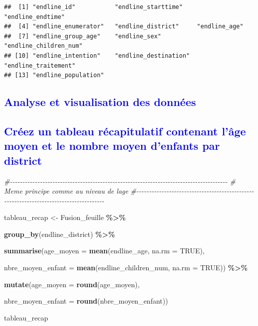 \documentclass[
]{article}
\newenvironment{Shaded}{\begin{snugshade}}{\end{snugshade}}
\newcommand{\AttributeTok}[1]{\textcolor[rgb]{0.13,0.29,0.53}{#1}}
\newcommand{\CommentTok}[1]{\textcolor[rgb]{0.56,0.35,0.01}{\textit{#1}}}
\newcommand{\ConstantTok}[1]{\textcolor[rgb]{0.56,0.35,0.01}{#1}}
\newcommand{\FunctionTok}[1]{\textcolor[rgb]{0.13,0.29,0.53}{\textbf{#1}}}
\newcommand{\NormalTok}[1]{#1}
\newcommand{\OtherTok}[1]{\textcolor[rgb]{0.56,0.35,0.01}{#1}}
\newcommand{\SpecialCharTok}[1]{\textcolor[rgb]{0.81,0.36,0.00}{\textbf{#1}}}
\begin{document}
\begin{verbatim}
##  [1] "endline_id"           "endline_starttime"    "endline_endtime"     
##  [4] "endline_enumerator"   "endline_district"     "endline_age"         
##  [7] "endline_group_age"    "endline_sex"          "endline_children_num"
## [10] "endline_intention"    "endline_destination"  "endline_traitement"  
## [13] "endline_population"
\end{verbatim}

\textcolor{blue}{\subsection{Analyse et visualisation des données}}

\textcolor{blue}{\subsection{Créez un tableau récapitulatif contenant l’âge moyen et le nombre moyen d’enfants par district}}

\begin{Shaded}
\begin{Highlighting}[]
\CommentTok{\#{-}{-}{-}{-}{-}{-}{-}{-}{-}{-}{-}{-}{-}{-}{-}{-}{-}{-}{-}{-}{-}{-}{-}{-}{-}{-}{-}{-}{-}{-}{-}{-}{-}{-}{-}{-}{-}{-}{-}{-}{-}{-}{-}{-}{-}{-}{-}{-}{-}{-}{-}{-}{-}{-}{-}{-}{-}{-}{-}{-}{-}{-}{-}{-}{-}{-}{-}{-}{-}{-}{-}{-}{-}{-}{-}{-}{-}{-}{-}{-}{-}{-}{-}{-}{-}{-}{-}}
\CommentTok{\#   Meme principe comme au niveau de l\textquotesingle{}age}
\CommentTok{\#{-}{-}{-}{-}{-}{-}{-}{-}{-}{-}{-}{-}{-}{-}{-}{-}{-}{-}{-}{-}{-}{-}{-}{-}{-}{-}{-}{-}{-}{-}{-}{-}{-}{-}{-}{-}{-}{-}{-}{-}{-}{-}{-}{-}{-}{-}{-}{-}{-}{-}{-}{-}{-}{-}{-}{-}{-}{-}{-}{-}{-}{-}{-}{-}{-}{-}{-}{-}{-}{-}{-}{-}{-}{-}{-}{-}{-}{-}{-}{-}{-}{-}{-}{-}{-}{-}{-}}

\NormalTok{tableau\_recap }\OtherTok{\textless{}{-}}\NormalTok{ Fusion\_feuille }\SpecialCharTok{\%\textgreater{}\%}
  
  \FunctionTok{group\_by}\NormalTok{(endline\_district) }\SpecialCharTok{\%\textgreater{}\%}
  
\FunctionTok{summarise}\NormalTok{(}\AttributeTok{age\_moyen =} \FunctionTok{mean}\NormalTok{(endline\_age, }\AttributeTok{na.rm =} \ConstantTok{TRUE}\NormalTok{),}
          
          \AttributeTok{nbre\_moyen\_enfant =} \FunctionTok{mean}\NormalTok{(endline\_children\_num, }\AttributeTok{na.rm =} \ConstantTok{TRUE}\NormalTok{)) }\SpecialCharTok{\%\textgreater{}\%}
  
  \FunctionTok{mutate}\NormalTok{(}\AttributeTok{age\_moyen =} \FunctionTok{round}\NormalTok{(age\_moyen),}
         
         \AttributeTok{nbre\_moyen\_enfant =} \FunctionTok{round}\NormalTok{(nbre\_moyen\_enfant))}

\NormalTok{tableau\_recap }
\end{Highlighting}
\end{Shaded}
\end{document}
